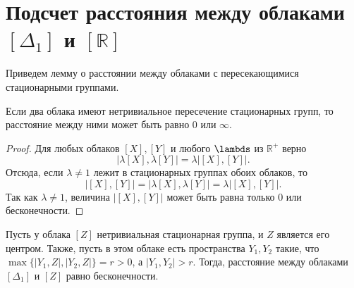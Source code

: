 
\section{Подсчет расстояния между облаками $[\Delta_1]$ и $[\mathbb{R}]$}

Приведем лемму о расстоянии между облаками с пересекающимися стационарными группами.
\begin{lemma}
	Если два облака имеют нетривиальное пересечение стационарных групп,
	то расстояние между ними может быть равно $0$ или $\infty$.
\label{lemmaDist}
\end{lemma}
\begin{proof}
	Для любых облаков $[X], [Y]$ и любого $\lambds$ из $\mathbb{R}^{+}$ верно
\[\big|\lambda[X], \lambda[Y]\big| = \lambda\big|[X], [Y]\big|.\]
Отсюда, если $\lambda \neq 1$ лежит в стационарных группах обоих облаков, то
\[\big|[X],[Y]\big| = \big|\lambda[X], \lambda[Y]\big| = \lambda\big|[X], [Y]\big|.\]
Так как $\lambda \neq 1$, величина $\big|[X],[Y]\big|$ может быть равна
только $0$ или бесконечности.
\end{proof}
\begin{theorem} Пусть у облака $[Z]$ нетривиальная стационарная группа, и $Z$
является его центром. Также, пусть в этом облаке есть пространства $Y_{1}, Y_{2}$
такие, что $\max\big\{ |Y_{1},Z|, |Y_{2}, Z| \big\} = r>0$, а
$|Y_{1}, Y_{2}|>r$. Тогда, расстояние между облаками $[\Delta_1]$ и $[Z]$
равно бесконечности.
\label{thrmDist}
\end{theorem} 
